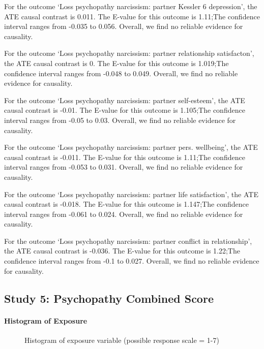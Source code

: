 \documentclass[
  singlecolumn]{article}
\let\oldparagraph\paragraph
\renewcommand{\paragraph}[1]{\oldparagraph{#1}\mbox{}}
\begin{document}
For the outcome `Loss psychopathy narcissism: partner Kessler 6
depression', the ATE causal contrast is 0.011. The E-value for this
outcome is 1.11;The confidence interval ranges from -0.035 to 0.056.
Overall, we find no reliable evidence for causality.

For the outcome `Loss psychopathy narcissism: partner relationship
satisfacton', the ATE causal contrast is 0. The E-value for this outcome
is 1.019;The confidence interval ranges from -0.048 to 0.049. Overall,
we find no reliable evidence for causality.

For the outcome `Loss psychopathy narcissism: partner self-esteem', the
ATE causal contrast is -0.01. The E-value for this outcome is 1.105;The
confidence interval ranges from -0.05 to 0.03. Overall, we find no
reliable evidence for causality.

For the outcome `Loss psychopathy narcissism: partner pers. wellbeing',
the ATE causal contrast is -0.011. The E-value for this outcome is
1.11;The confidence interval ranges from -0.053 to 0.031. Overall, we
find no reliable evidence for causality.

For the outcome `Loss psychopathy narcissism: partner life
satisfaction', the ATE causal contrast is -0.018. The E-value for this
outcome is 1.147;The confidence interval ranges from -0.061 to 0.024.
Overall, we find no reliable evidence for causality.

For the outcome `Loss psychopathy narcissism: partner conflict in
relationship', the ATE causal contrast is -0.036. The E-value for this
outcome is 1.22;The confidence interval ranges from -0.1 to 0.027.
Overall, we find no reliable evidence for causality.

\subsection{Study 5: Psychopathy Combined
Score}\label{study-5-psychopathy-combined-score}

\paragraph{Histogram of Exposure}\label{histogram-of-exposure-4}

\begin{figure}


\caption{\label{fig-histogram-psychopathy}Histogram of exposure variable
(possible response scale = 1-7)}

\end{figure}%
\end{document}
